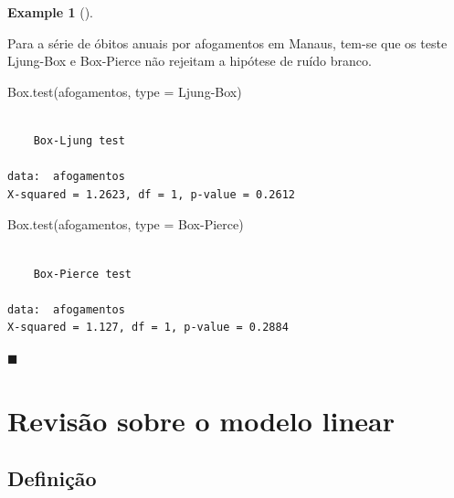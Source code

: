 \documentclass[
  letterpaper,
  DIV=11,
  numbers=noendperiod]{scrartcl}
\newenvironment{Shaded}{\begin{snugshade}}{\end{snugshade}}
\newcommand{\AttributeTok}[1]{\textcolor[rgb]{0.40,0.45,0.13}{#1}}
\newcommand{\FunctionTok}[1]{\textcolor[rgb]{0.28,0.35,0.67}{#1}}
\newcommand{\NormalTok}[1]{\textcolor[rgb]{0.00,0.23,0.31}{#1}}
\newcommand{\StringTok}[1]{\textcolor[rgb]{0.13,0.47,0.30}{#1}}
\theoremstyle{definition}
\newtheorem{example}{Example}[chapter]
\theoremstyle{definition}
\theoremstyle{plain}
\theoremstyle{plain}
\theoremstyle{remark}
\begin{document}
\begin{example}[]\protect\hypertarget{exm-afogamentos_testes}{}\label{exm-afogamentos_testes}

Para a série de óbitos anuais por afogamentos em Manaus, tem-se que os
teste Ljung-Box e Box-Pierce não rejeitam a hipótese de ruído branco.

\begin{Shaded}
\begin{Highlighting}[]
\FunctionTok{Box.test}\NormalTok{(afogamentos, }\AttributeTok{type =} \StringTok{\textquotesingle{}Ljung{-}Box\textquotesingle{}}\NormalTok{)}
\end{Highlighting}
\end{Shaded}

\begin{verbatim}

    Box-Ljung test

data:  afogamentos
X-squared = 1.2623, df = 1, p-value = 0.2612
\end{verbatim}

\begin{Shaded}
\begin{Highlighting}[]
\FunctionTok{Box.test}\NormalTok{(afogamentos, }\AttributeTok{type =} \StringTok{\textquotesingle{}Box{-}Pierce\textquotesingle{}}\NormalTok{)}
\end{Highlighting}
\end{Shaded}

\begin{verbatim}

    Box-Pierce test

data:  afogamentos
X-squared = 1.127, df = 1, p-value = 0.2884
\end{verbatim}

\(\blacksquare\)

\end{example}


\chapter{Revisão sobre o modelo
linear}\label{revisuxe3o-sobre-o-modelo-linear}

\section{Definição}\label{definiuxe7uxe3o}
\end{document}
